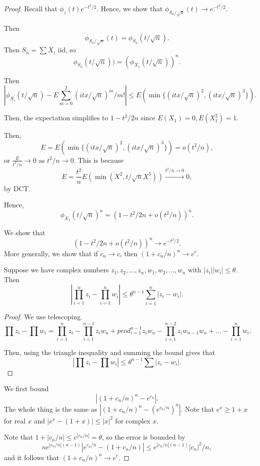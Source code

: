 \documentclass[11pt]{scrartcl}
\begin{document}
\begin{proof}
Recall that $\phi_z(t) e^{-t^2/2}$.  Hence, we show that $\phi_{S_n/\sqrt{n}}(t) \to e^{-t^2/2}$.

Then $$\phi_{S_n/\sqrt{n}}(t) = \phi_{S_n}(t/\sqrt{n}).$$  Then $S_n = \sum X_i$ iid, so $$\phi_{S_n}(t/\sqrt{n})) = (\phi_{X_1}(t/\sqrt{n}))^n.$$

Then $$|\phi_{X_i}(t/\sqrt{n}) - E\sum_{m=0}^2 (itx/\sqrt{n})^m/m!|\le E(\min\{(itx/\sqrt{n})^2, (itx/\sqrt{n})^3\}) .$$

Then, the expectation simplifies to $1 - t^2/2n$ since $E(X_1) = 0, E(X_1^2) = 1$.

Then,
$$E = E(\min\{(itx/\sqrt{n})^2, (itx/\sqrt{n})^3\}) = o(t^2/n),$$
or $\frac{E}{t^2/n} \to 0$ as $t^2/n \to 0$.  This is because $$E = \frac{t^2}{n} E(\min(X^2, t/\sqrt{n}X^3)) \xrightarrow{t^2/n \to 0} 0,$$
by DCT.

Hence,
$$\phi_{X_1}(t/\sqrt{n})^n = (1 - t^2/2n + o(t^2/n))^n.$$  

We show that 
$$(1 - t^2/2n + o(t^2/n))^n \to e^{-t^2/2}.$$
More generally, we show that if $c_n \to c$, then $(1 + c_n/n)^n \to e^c$.

\begin{lemma} Suppose we have complex numbers $z_1, z_2, \dots, z_n, w_1, w_2, \dots, w_n$ with $|z_i||w_i| \le \theta$.  Then 
$$\left |\prod_{i=1}^n z_i - \prod_{i=1}^n w_i\right |\le \theta^{n-1}\sum_{i=1}^n |z_i - w_i|.$$
\end{lemma}
\begin{proof}
We use telescoping.
$$\prod z_i - \prod w_i = \prod_{i=1}^n z_i - \prod_{i=1}^{n-1} z_iw_n  + prod_{i=1}^{n-1} z_iw_n - \prod_{i=1}^{n-2}z_iw_{n-1}w_n + \dots - \prod_{i=1}^{n} w_i. $$

Then, using the triangle inequality and summing the bound gives that 
$$|\prod z_i - \prod w_i| \le \theta^{n-1} \sum |z_i - w_i|.$$
\end{proof}

We first bound $$\left|(1 + c_n/n)^n - e^{c_n}\right|.$$
The whole thing is the same as $|(1 + c_n/n)^n - (e^{c_n/n})^n|$.  Note that $e^{x} \ge 1+x$ for real $x$ and $|e^x - (1+x)| \le |x|^2$ for complex $x$.

Note that $1 + |c_n/n| \le e^{|c_n/n|} = \theta$, so the error is bounded by
$$ne^{|c_n/n|(n-1)}|e^{c_n/n} - (1 + c_n/n)| \le e^{|c_n/n|(n-1)}|c_n|^2/n,$$
and it follows that $(1 + c_n/n)^n \to e^{c}$.
\end{proof}
\end{document}
